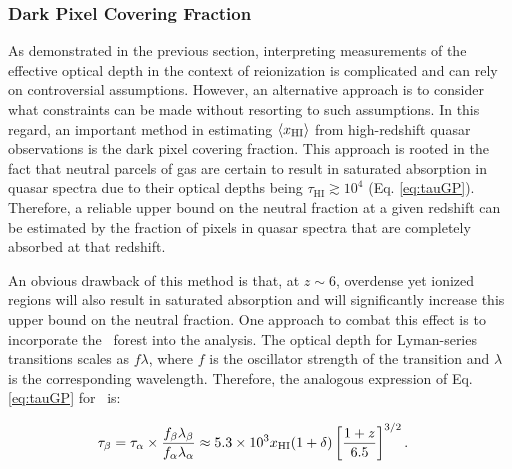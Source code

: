 %
%


\subsubsection{Dark Pixel Covering Fraction}

As demonstrated in the previous section, interpreting measurements of the effective optical depth in the context of reionization is complicated and can rely on controversial assumptions. However, an alternative approach is to consider what constraints can be made without resorting to such assumptions. In this regard, an important method in estimating $\langle x_{\text{HI}}\rangle$ from high-redshift quasar observations is the dark pixel covering fraction. This approach is rooted in the fact that neutral parcels of gas are certain to result in saturated absorption in quasar spectra due to their optical depths being $\tau_{\text{HI}} \gtrsim 10^4$ (Eq. \ref{eq:tauGP}). Therefore, a reliable upper bound on the neutral fraction at a given redshift can be estimated by the fraction of pixels in quasar spectra that are completely absorbed at that redshift. 

An obvious drawback of this method is that, at $z \sim 6$, overdense yet ionized regions will also result in saturated absorption and will significantly increase this upper bound on the neutral fraction. One approach to combat this effect is to incorporate the \lyb\ forest into the analysis. The optical depth for Lyman-series transitions scales as $f\lambda$, where $f$ is the oscillator strength of the transition and $\lambda$ is the corresponding wavelength. Therefore, the analogous expression of Eq. \ref{eq:tauGP} for \lyb\ is:

\begin{align}
\tau_{\beta} &= \tau_{\alpha} \times \dfrac{f_{\beta}\lambda_{\beta}}{f_{\alpha}\lambda_{\alpha}} \approx 5.3 \times 10^{3} x_{\text{HI}} (1 + \delta) \left[\dfrac{1+z}{6.5}\right]^{3/2}. \label{eq:tauGPB}
\end{align}

